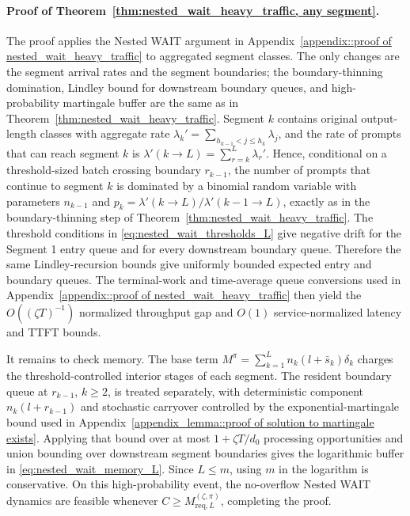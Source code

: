 \paragraph{Proof of Theorem~\ref{thm:nested_wait_heavy_traffic, any segment}.}
The proof applies the Nested WAIT argument in Appendix~\ref{appendix::proof of nested_wait_heavy_traffic} to aggregated segment classes. The only changes are the segment arrival rates and the segment boundaries; the boundary-thinning domination, Lindley bound for downstream boundary queues, and high-probability martingale buffer are the same as in Theorem~\ref{thm:nested_wait_heavy_traffic}. Segment \(k\) contains original output-length classes with aggregate rate \(\lambda_k'=\sum_{h_{k-1}<j\le h_k}\lambda_j\), and the rate of prompts that can reach segment \(k\) is \(\lambda'(k\to L)=\sum_{r=k}^L\lambda_r'\). Hence, conditional on a threshold-sized batch crossing boundary \(r_{k-1}\), the number of prompts that continue to segment \(k\) is dominated by a binomial random variable with parameters \(n_{k-1}\) and \(p_k=\lambda'(k\to L)/\lambda'(k-1\to L)\), exactly as in the boundary-thinning step of Theorem~\ref{thm:nested_wait_heavy_traffic}. The threshold conditions in \eqref{eq:nested_wait_thresholds_L} give negative drift for the Segment 1 entry queue and for every downstream boundary queue. Therefore the same Lindley-recursion bounds give uniformly bounded expected entry and boundary queues. The terminal-work and time-average queue conversions used in Appendix~\ref{appendix::proof of nested_wait_heavy_traffic} then yield the \(O((\zeta T)^{-1})\) normalized throughput gap and \(O(1)\) service-normalized latency and TTFT bounds.

It remains to check memory. The base term \(M^\pi=\sum_{k=1}^L n_k(l+\bar s_k)\delta_k\) charges the threshold-controlled interior stages of each segment. The resident boundary queue at \(r_{k-1}\), \(k\ge2\), is treated separately, with deterministic component \(n_k(l+r_{k-1})\) and stochastic carryover controlled by the exponential-martingale bound used in Appendix~\ref{appendix_lemma::proof of solution to martingale exists}. Applying that bound over at most \(1+\zeta T/d_0\) processing opportunities and union bounding over downstream segment boundaries gives the logarithmic buffer in \eqref{eq:nested_wait_memory_L}. Since \(L\le m\), using \(m\) in the logarithm is conservative. On this high-probability event, the no-overflow Nested WAIT dynamics are feasible whenever \(C\ge M_{\mathrm{req},L}^{(\zeta,\pi)}\), completing the proof.

